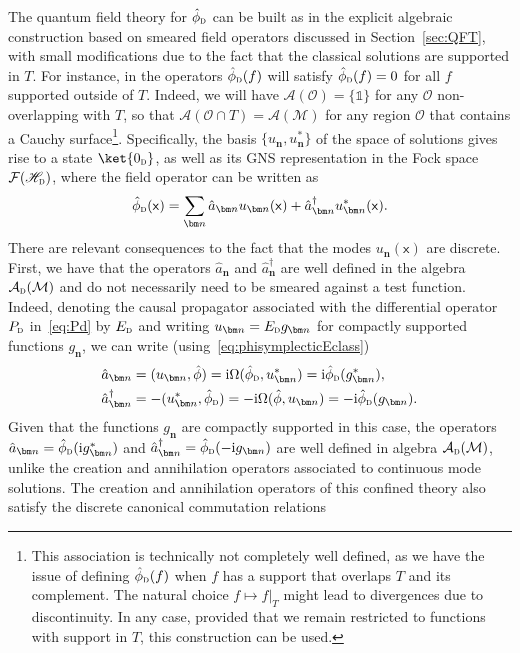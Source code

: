 \documentclass[letterpaper,12pt,titlepage,oneside,final]{book}
\newcommand{\openone}{\mathds{1}}
\newcommand{\M}{\mathcal{M}}
\newcommand{\mf}{\mathsf}%
\newcommand{\ii}{\mathrm{i}}
\newcommand{\tc}[1]{\textsc{#1}}
\begin{document}
The quantum field theory for $\hat{\phi}_\tc{d}$ can be built as in the explicit algebraic construction based on smeared field operators discussed in Section~\ref{sec:QFT}, with small modifications due to the fact that the classical solutions are supported in $T$. For instance, in the operators $\hat{\phi}_\tc{d}(f)$ will satisfy $\hat{\phi}_\tc{d}(f) = 0$ for all $f$ supported outside of $T$. Indeed, we will have $\mathcal{A}(\mathcal{O}) = \{\openone\}$ for any $\mathcal{O}$ non-overlapping with $T$, so that $\mathcal{A}(\mathcal{O}\cap T) = \mathcal{A}(\M)$ for any region $\mathcal{O}$ that contains a Cauchy surface\footnote{This association is technically not completely well defined, as we have the issue of defining $\hat{\phi}_\tc{d}(f)$ when $f$ has a support that overlaps $T$ and its complement. The natural choice $f\mapsto f|_T$ might lead to divergences due to discontinuity. In any case, provided that we remain restricted to functions with support in $T$, this construction can be used.}. Specifically, the basis $\{u_{\bm n},u_{\bm n}^*\}$ of the space of solutions gives rise to a state $\ket{0_\tc{d}}$, as well as its GNS representation in the Fock space $\mathcal{F}(\mathscr{H}_\tc{d})$, where the field operator can be written as
\begin{equation}\label{eq:GNSphid}
    \hat{\phi}_\tc{d}(\mf x) = \sum_{\bm n} \hat{a}_{\bm n} u_{\bm n}(\mf x) + \hat{a}_{\bm n}^\dagger u_{\bm n}^*(\mf x).
\end{equation}
There are relevant consequences to the fact that the modes $u_{\bm n}(\mf x)$ are discrete. First, we have that the operators $\hat{a}_{\bm n}$ and $\hat{a}_{\bm n}^\dagger$ are well defined in the algebra $\mathcal{A}_\tc{d}(\M)$ and do not necessarily need to be smeared against a test function. Indeed, denoting the causal propagator associated with the differential operator $P_\tc{d}$ in~\eqref{eq:Pd} by $E_\tc{d}$ and writing $u_{\bm n} = E_\tc{d}g_{\bm n}$ for compactly supported functions $g_{\bm n}$, we can write (using~\eqref{eq:phisymplecticEclass})
\begin{align}
    \hat{a}_{\bm n} &= (u_{\bm n},\hat{\phi}) = \ii \Omega(\hat{\phi}_\tc{d},u_{\bm n}^*) = \ii \hat{\phi}_\tc{d}(g_{\bm n}^*),\label{eq:an}\\
    \hat{a}_{\bm n}^\dagger &= - (u_{\bm n}^*,\hat{\phi}_\tc{d}) = - \ii \Omega(\hat{\phi},u_{\bm n}) = - \ii \hat{\phi}_\tc{d}(g_{\bm n}).\label{eq:and}
\end{align}
Given that the functions $g_{\bm n}$ are compactly supported in this case, the operators $\hat{a}_{\bm n} = \hat{\phi}_\tc{d}(\ii g_{\bm n}^*)$ and $\hat{a}_{\bm n}^\dagger = \hat{\phi}_\tc{d}(-\ii g_{\bm n})$ are well defined in algebra $\mathcal{A}_\tc{d}(\M)$, unlike the creation and annihilation operators associated to continuous mode solutions. The creation and annihilation operators of this confined theory also satisfy the discrete canonical commutation relations
\end{document}
